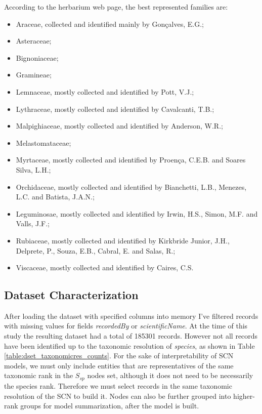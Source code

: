 \documentclass[a4paper]{article}
\begin{document}
According to the herbarium web page, the best represented families are:

\begin{itemize}
\item Araceae, collected and identified mainly by Gonçalves, E.G.;
\item Asteraceae;
\item Bignoniaceae;
\item Gramineae;
\item Lemnaceae, mostly collected and identified by Pott, V.J.;
\item Lythraceae, mostly collected and identified by Cavalcanti, T.B.;
\item Malpighiaceae, mostly collected and identified by Anderson, W.R.;
\item Melastomataceae;
\item Myrtaceae, mostly collected and identified by Proença, C.E.B. and Soares Silva, L.H.;
\item Orchidaceae, mostly collected and identified by Bianchetti, L.B., Menezes, L.C. and Batista, J.A.N.;
\item Leguminosae, mostly collected and identified by Irwin, H.S., Simon, M.F. and Valls, J.F.;
\item Rubiaceae, mostly collected and identified by Kirkbride Junior, J.H., Delprete, P., Souza, E.B., Cabral, E. and Salas, R.;
\item Viscaceae, mostly collected and identified by Caires, C.S.
\end{itemize}

\subsection{Dataset Characterization}

After loading the dataset with specified columns into memory I've filtered records with missing values for fields \textit{recordedBy} or \textit{scientificName}.
At the time of this study the resulting dataset had a total of 185301 records. However not all records have been identified up to the taxonomic resolution of \textit{species}, as shown in Table \ref{table:dset_taxonomicres_counts}. For the sake of interpretability of SCN models, we must only include entities that are representatives of the same taxonomic rank in the $S_{sp}$ nodes set, although it does not need to be necessarily the species rank. Therefore we must select records in the same taxonomic resolution of the SCN to build it.
Nodes can also be further grouped into higher-rank groups for model summarization, after the model is built. 
\end{document}

